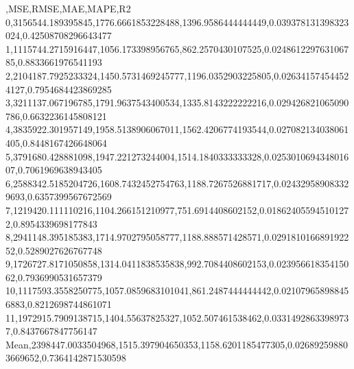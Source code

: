,MSE,RMSE,MAE,MAPE,R2
0,3156544.189395845,1776.6661853228488,1396.9586444444449,0.039378131398323024,0.42508708296643477
1,1115744.2715916447,1056.173398956765,862.2570430107525,0.024861229763106785,0.8833661976541193
2,2104187.7925233324,1450.5731469245777,1196.0352903225805,0.026341574544524127,0.7954684423869285
3,3211137.067196785,1791.9637543400534,1335.8143222222216,0.029426821065090786,0.6632236145808121
4,3835922.301957149,1958.5138906067011,1562.4206774193544,0.027082134038061405,0.8448167426648064
5,3791680.428881098,1947.221273244004,1514.1840333333328,0.025301069434801607,0.7061969638943405
6,2588342.5185204726,1608.7432452754763,1188.7267526881717,0.024329589083329693,0.6357399567672569
7,1219420.111110216,1104.266151210977,751.6914408602152,0.018624055945101272,0.8954339698177843
8,2941148.395185383,1714.9702795058777,1188.888571428571,0.029181016689192252,0.5289027626767748
9,1726727.8171050858,1314.0411838535838,992.7084408602153,0.02395661835415062,0.7936990531657379
10,1117593.3558250775,1057.0859683101041,861.2487444444442,0.021079658988456883,0.8212698744861071
11,1972915.7909138715,1404.55637825327,1052.507461538462,0.03314928633989737,0.8437667847756147
Mean,2398447.0033504968,1515.397904650353,1158.6201185477305,0.026892598803669652,0.7364142871530598

